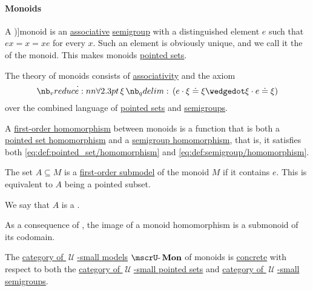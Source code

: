 \paragraph{Monoids}

\begin{definition}\label{def:monoid}
  A \term[ru=моноид (\cite[94]{Мальцев1970Системы})]{monoid} is an \hyperref[eq:def:binary_operation/associative]{associative} \hyperref[def:semigroup]{semigroup} with a distinguished element \( e \) such that \( ex = x = xe \) for every \( x \). Such an element is obviously unique, and we call it the  of the monoid. This makes monoids \hyperref[def:pointed_set]{pointed sets}.

  \begin{thmenum}
     The theory of monoids consists of \hyperref[eq:def:binary_operation/associative]{associativity} and the axiom
    \begin{equation}\label{eq:def:monoid/theory/neutral}
      \qforall \xi (e \cdot \xi \syneq \xi \synwedge \xi \cdot e \syneq \xi)
    \end{equation}
    over the combined language of \hyperref[def:pointed_set/theory]{pointed sets} and \hyperref[def:semigroup/theory]{semigroups}.

     A \hyperref[def:first_order_homomorphism]{first-order homomorphism} between monoids is a function that is both a \hyperref[def:pointed_set/homomorphism]{pointed set homomorphism} and a \hyperref[def:semigroup/homomorphism]{semigroup homomorphism}, that is, it satisfies both \eqref{eq:def:pointed_set/homomorphism} and \eqref{eq:def:semigroup/homomorphism}.

     The set \( A \subseteq M \) is a \hyperref[def:first_order_submodel]{first-order submodel} of the monoid \( M \) if it contains \( e \). This is equivalent to \( A \) being a pointed subset.

    We say that \( A \) is a .

    As a consequence of , the image of a monoid homomorphism is a submonoid of its codomain.

     The \hyperref[def:category_of_small_first_order_models]{category of \( \mscrU \)-small models} \( \ucat{Mon} \) of monoids is \hyperref[def:concrete_category]{concrete} with respect to both the \hyperref[def:pointed_set/category]{category of \( \mscrU \)-small pointed sets} and \hyperref[def:semigroup/category]{category of \( \mscrU \)-small semigroups}.


\end{thmenum}
\end{definition}

